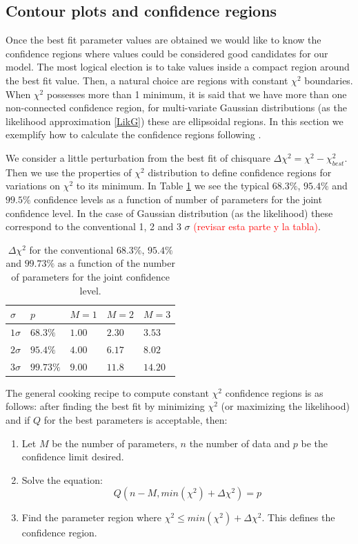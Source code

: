 \documentclass[onecolumn,           %
               showpacs,            %
               preprintnumbers,     %
               aps,                 %
               letterpaper,             %
               superscriptaddress,      %
               nofootinbib,         %
               tightenlines,        %
               floats,floatfix      %
               ,usenatbib,
               ]{revtex4-1}
\begin{document}
\subsection{Contour plots and confidence regions}

Once the best fit parameter values are obtained we would like to know the confidence regions where values could be considered good candidates for our model. The most logical election is to take values inside a compact region around the best fit value. Then, a natural choice are regions with constant $\chi^2$ boundaries. When $\chi^2$ possesses more than 1 minimum, it is said that we have more than one non-connected confidence region, for multi-variate Gaussian distributions (as the likelihood approximation \eqref{LikG}) these are ellipsoidal regions. In this section we exemplify how to calculate the confidence regions following \cite{LiV}. 

We consider a little perturbation from the best fit of chisquare $\Delta\chi^2=\chi^2-\chi^2_{best}$. Then we use the properties of $\chi^2$ distribution to define confidence regions for variations on $\chi^2$ to its minimum. In Table \ref{tableerrors} we see the typical $68.3 \%$, $95.4\%$ and $99.5\%$ confidence levels as a function of number of parameters for the joint confidence level. In the case of Gaussian distribution (as the likelihood) these correspond to the conventional 1, 2 and 3 $\sigma$ \textcolor{red}{(revisar esta parte y la tabla)}.
\begin{table}[h!]
\centering
\begin{tabular}{||l|l|l|l|l||} 
 \hline
$\sigma$ & $p$ & $M=1$ & $M=2$ & $M=3$\\
\hline
$1\sigma$ & $68.3 \%$ & $1.00$ & $2.30$ & $3.53$\\
$2\sigma$ & $95.4 \%$ & $4.00$ & $6.17$ & $8.02$\\
$3\sigma$ & $99.73\%$ & $9.00$ & $11.8$ & $14.20$\\
\hline
\end{tabular}
\caption{\footnotesize{$\Delta \chi^2$ for the conventional $68.3\%$, $95.4\%$ and $99.73\%$ as a function of the number of parameters for the joint confidence level.}}\label{tableerrors}
\end{table}

The general cooking recipe to compute constant $\chi^2$ confidence regions is as follows: after finding the best fit by minimizing $\chi^2$ (or maximizing the likelihood) and if $Q$ for the best parameters is acceptable, then:
\begin{enumerate}
\item Let $M$ be the number of parameters, $n$ the number of data and $p$ be the confidence limit desired.
\item Solve the equation:
\begin{equation}
Q(n-M,min(\chi^2)+\Delta\chi^2)=p
\end{equation}
\item Find the parameter region where $\chi^2\leq min(\chi^2)+\Delta\chi^2$. This defines the confidence region.
\end{enumerate}
\end{document}
